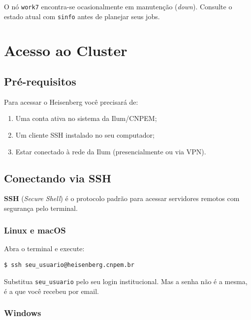 \documentclass[11pt, a4paper]{article}
\newcommand{\cmd}[1]{\texttt{\textcolor{codeblue}{#1}}}
\begin{document}
\begin{info}
  O nó \texttt{work7} encontra-se ocasionalmente em manutenção (\textit{down}).
  Consulte o estado atual com \cmd{sinfo} antes de planejar seus jobs.
\end{info}

\section{Acesso ao Cluster}

\subsection{Pré-requisitos}

Para acessar o Heisenberg você precisará de:
\begin{enumerate}
  \item Uma conta ativa no sistema da Ilum/CNPEM;
  \item Um cliente SSH instalado no seu computador;
  \item Estar conectado à rede da Ilum (presencialmente ou via VPN).
\end{enumerate}

\subsection{Conectando via SSH}

\textbf{SSH} (\textit{Secure Shell}) é o protocolo padrão para acessar servidores
remotos com segurança pelo terminal.

\subsubsection{Linux e macOS}

Abra o terminal e execute:

\begin{lstlisting}[style=terminal]
$ ssh seu_usuario@heisenberg.cnpem.br
\end{lstlisting}

Substitua \texttt{seu\_usuario} pelo seu login institucional. Mas a senha não é a mesma, é a que você recebeu por email.

\subsubsection{Windows}
\end{document}
